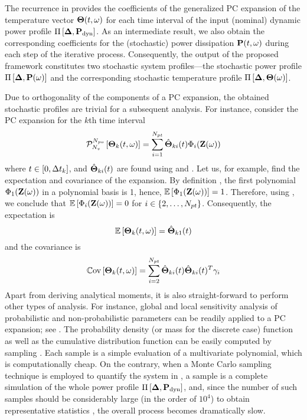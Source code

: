 The recurrence in  provides the coefficients of the generalized PC expansion of the temperature vector ${\boldsymbol\Theta}(t, \omega)$ for each time interval of the input (nominal) dynamic power profile $\prof{\mP_\dyn}$. As an intermediate result, we also obtain the corresponding coefficients for the (stochastic) power dissipation $\mathbf{P}(t, \omega)$ during each step of the iterative process. Consequently, the output of the proposed framework constitutes two stochastic system profiles---the stochastic power profile $\prof{\mP(\o)}$ and the corresponding stochastic temperature profile $\Pi\left[\boldsymbol{\Delta}, {\boldsymbol\Theta}(\omega)\right]$.

Due to orthogonality of the components of a PC expansion, the obtained stochastic profiles are trivial for a subsequent analysis. For instance, consider the PC expansion for the $k$th time interval
\begin{equation} \elabel{pc-k}
  \oPC{\vars}{\pcorder}{\vTO_k(\t, \o)} = \sum_{i = 1}^{\pcterms} \pcc{\vTO}_{ki}(\t) \pcb_i(\vZ(\o))
\end{equation}
where $t \in [0, \Delta t_k]$, and $\hat{{\boldsymbol\Theta}}_{ki}(t)$ are found using  and . Let us, for example, find the expectation and covariance of the expansion. By definition \cite{xiu2002}, the first polynomial $\Phi_1(\mathbf{Z}(\omega))$ in a polynomial basis is 1, hence, $\mathbb{E}\left[\Phi_1(\mathbf{Z}(\omega))\right] = 1$. Therefore, using , we conclude that $\mathbb{E}\left[\Phi_i(\mathbf{Z}(\omega))\right] = 0$ for $i \in \{ 2, \dotsc, {N_{pt}} \}$. Consequently, the expectation is
\[
  \mathbb{E}\left[{\boldsymbol\Theta}_k(t, \omega)\right] = \hat{{\boldsymbol\Theta}}_{k1}(t)
\]
and the covariance is
\[
  \mathbb{C}\text{ov}\left[{\boldsymbol\Theta}_k(t, \omega)\right] = \sum_{i = 2}^{{N_{pt}}} \hat{{\boldsymbol\Theta}}_{ki}(t) \hat{{\boldsymbol\Theta}}_{ki}(t)^T \gamma_i
\]
Apart from deriving analytical moments, it is also straight-forward to perform other types of analysis. For instance, global and local sensitivity analysis of probabilistic and non-probabilistic parameters can be readily applied to a PC expansion; see \cite{eldred2009, maitre2010}. The probability density (or mass for the discrete case) function as well as the cumulative distribution function can be easily computed by sampling . Each sample is a simple evaluation of a multivariate polynomial, which is computationally cheap. On the contrary, when a Monte Carlo sampling technique is employed to quantify the system in , a sample is a complete simulation of the whole power profile $\prof{\mP_\dyn}$, and, since the number of such samples should be considerably large (in the order of $10^4$) to obtain representative statistics \cite{xiu2009}, the overall process becomes dramatically slow.

